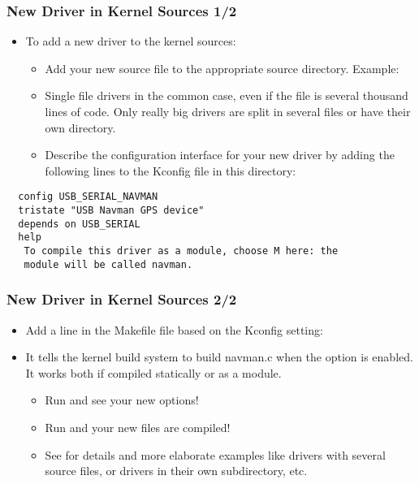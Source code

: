 \begin{frame}[fragile]
  \frametitle{New Driver in Kernel Sources 1/2}
  \begin{itemize}
  \item To add a new driver to the kernel sources:
    \begin{itemize}
    \item Add your new source file to the appropriate source
      directory. Example: 
    \item Single file drivers in the common case, even if the file is
      several thousand lines of code. Only really big drivers are
      split in several files or have their own directory.
    \item Describe the configuration interface for your new driver by
      adding the following lines to the Kconfig file in this
      directory:
    \end{itemize}
  \end{itemize}

\begin{verbatim}
  config USB_SERIAL_NAVMAN
  tristate "USB Navman GPS device"
  depends on USB_SERIAL
  help
   To compile this driver as a module, choose M here: the
   module will be called navman.
\end{verbatim}
\end{frame}

\begin{frame}
  \frametitle{New Driver in Kernel Sources 2/2}
  \begin{itemize}
  \item Add a line in the Makefile file based on the Kconfig setting:
  \item It tells the kernel build system to build navman.c when the
     option is enabled. It works both if
    compiled statically or as a module.
    \begin{itemize}
    \item Run  and see your new options!
    \item Run  and your new files are compiled!
    \item See  for details and more
      elaborate examples like drivers with several source files, or
      drivers in their own subdirectory, etc.
    \end{itemize}
  \end{itemize}
\end{frame}

